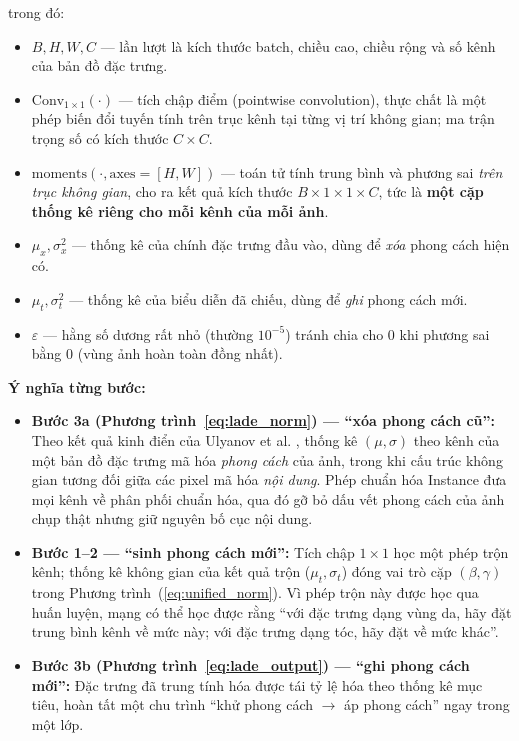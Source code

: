 \noindent trong đó:
\begin{itemize}
    \item $B, H, W, C$ --- lần lượt là kích thước batch, chiều cao, chiều rộng và số kênh của bản đồ đặc trưng.
    \item $\text{Conv}_{1\times1}(\cdot)$ --- tích chập điểm (pointwise convolution), thực chất là một phép biến đổi tuyến tính trên trục kênh tại từng vị trí không gian; ma trận trọng số có kích thước $C \times C$.
    \item $\text{moments}(\cdot, \text{axes}=[H,W])$ --- toán tử tính trung bình và phương sai \textit{trên trục không gian}, cho ra kết quả kích thước $B \times 1 \times 1 \times C$, tức là \textbf{một cặp thống kê riêng cho mỗi kênh của mỗi ảnh}.
    \item $\mu_x, \sigma_x^2$ --- thống kê của chính đặc trưng đầu vào, dùng để \textit{xóa} phong cách hiện có.
    \item $\mu_t, \sigma_t^2$ --- thống kê của biểu diễn đã chiếu, dùng để \textit{ghi} phong cách mới.
    \item $\varepsilon$ --- hằng số dương rất nhỏ (thường $10^{-5}$) tránh chia cho 0 khi phương sai bằng 0 (vùng ảnh hoàn toàn đồng nhất).
\end{itemize}

\textbf{Ý nghĩa từng bước:}
\begin{itemize}
    \item \textbf{Bước 3a (Phương trình~\ref{eq:lade_norm}) --- ``xóa phong cách cũ'':} Theo kết quả kinh điển của Ulyanov et al. \cite{Ulyanov2016}, thống kê $(\mu, \sigma)$ theo kênh của một bản đồ đặc trưng mã hóa \textit{phong cách} của ảnh, trong khi cấu trúc không gian tương đối giữa các pixel mã hóa \textit{nội dung}. Phép chuẩn hóa Instance đưa mọi kênh về phân phối chuẩn hóa, qua đó gỡ bỏ dấu vết phong cách của ảnh chụp thật nhưng giữ nguyên bố cục nội dung.
    \item \textbf{Bước 1--2 --- ``sinh phong cách mới'':} Tích chập $1\times1$ học một phép trộn kênh; thống kê không gian của kết quả trộn ($\mu_t, \sigma_t$) đóng vai trò cặp $(\beta, \gamma)$ trong Phương trình~(\ref{eq:unified_norm}). Vì phép trộn này được học qua huấn luyện, mạng có thể học được rằng ``với đặc trưng dạng vùng da, hãy đặt trung bình kênh về mức này; với đặc trưng dạng tóc, hãy đặt về mức khác''.
    \item \textbf{Bước 3b (Phương trình~\ref{eq:lade_output}) --- ``ghi phong cách mới'':} Đặc trưng đã trung tính hóa được tái tỷ lệ hóa theo thống kê mục tiêu, hoàn tất một chu trình ``khử phong cách $\rightarrow$ áp phong cách'' ngay trong một lớp.
\end{itemize}

